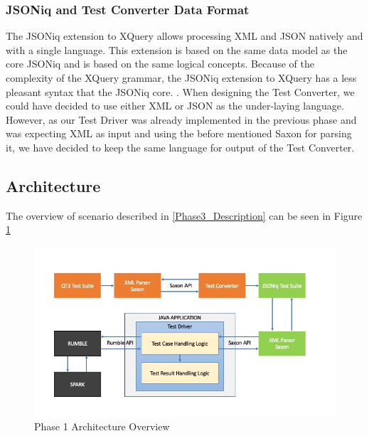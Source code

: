 \subsubsection{JSONiq and Test Converter Data Format}
The JSONiq extension to XQuery allows processing XML and JSON natively and with a single language. This extension is based on the same data model as the core JSONiq and is based on the same logical concepts. Because of the complexity of the XQuery grammar, the JSONiq extension to XQuery has a less pleasant syntax that the JSONiq core. . When designing the Test Converter, we could have decided to use either XML or JSON as the under-laying language. However, as our Test Driver was already implemented in the previous phase and was expecting XML as input and using the before mentioned Saxon for parsing it, we have decided to keep the same language for output of the Test Converter. 

\subsection{Architecture}
The overview of scenario described in \ref{Phase3_Description} can be seen in Figure \ref{fig:Phase3_Architecture}
\begin{figure}[h!]
	\vspace*{-5mm}
	\includegraphics[width=\linewidth]{architecture_diagram_phase_3.jpg}
	\vspace*{-15mm}
	\caption{Phase 1 Architecture Overview}
	\label{fig:Phase3_Architecture}
\end{figure}